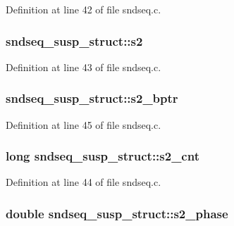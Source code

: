 Definition at line 42 of file sndseq.\+c.

\subsubsection[{\texorpdfstring{s2}{s2}}]{ sndseq\+\_\+susp\+\_\+struct\+::s2}\hypertarget{structsndseq__susp__struct_a75a750d3f6e731bebc9e217455961460}{}\label{structsndseq__susp__struct_a75a750d3f6e731bebc9e217455961460}


Definition at line 43 of file sndseq.\+c.

\subsubsection[{\texorpdfstring{s2\+\_\+bptr}{s2_bptr}}]{ sndseq\+\_\+susp\+\_\+struct\+::s2\+\_\+bptr}\hypertarget{structsndseq__susp__struct_a3759a96ce36fdee293c2bc6be1a801a5}{}\label{structsndseq__susp__struct_a3759a96ce36fdee293c2bc6be1a801a5}


Definition at line 45 of file sndseq.\+c.

\subsubsection[{\texorpdfstring{s2\+\_\+cnt}{s2_cnt}}]{\setlength{\rightskip}{0pt plus 5cm}long sndseq\+\_\+susp\+\_\+struct\+::s2\+\_\+cnt}\hypertarget{structsndseq__susp__struct_abc4f99cbcc64b590073662e5be968288}{}\label{structsndseq__susp__struct_abc4f99cbcc64b590073662e5be968288}


Definition at line 44 of file sndseq.\+c.

\subsubsection[{\texorpdfstring{s2\+\_\+phase}{s2_phase}}]{\setlength{\rightskip}{0pt plus 5cm}double sndseq\+\_\+susp\+\_\+struct\+::s2\+\_\+phase}\hypertarget{structsndseq__susp__struct_af81c0a094b63d2cc078bb819f5417ea5}{}\label{structsndseq__susp__struct_af81c0a094b63d2cc078bb819f5417ea5}


